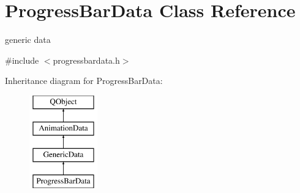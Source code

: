 \hypertarget{class_progress_bar_data}{}\section{Progress\+Bar\+Data Class Reference}
\label{class_progress_bar_data}


generic data  




{\ttfamily \#include $<$progressbardata.\+h$>$}

Inheritance diagram for Progress\+Bar\+Data\+:\begin{figure}[H]
\begin{center}
\leavevmode
\includegraphics[height=4.000000cm]{class_progress_bar_data}
\end{center}
\end{figure}

